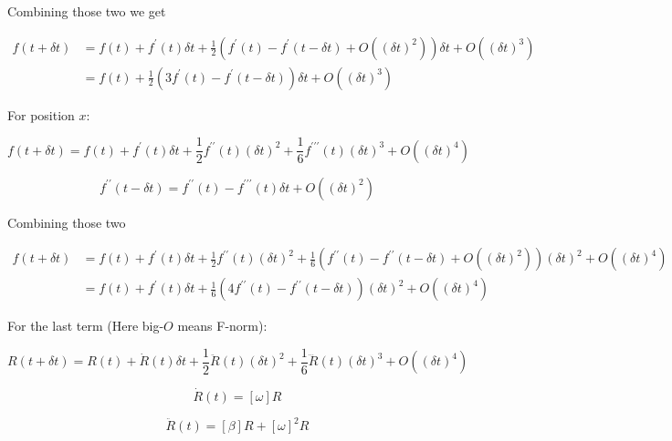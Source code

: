 \documentclass[utf8]{article}
\begin{document}
Combining those two we get

\begin{equation}\label{}
 \begin{aligned}
  f(t + \delta t) &= f(t) + f^\prime (t) \delta t + \frac{1}{2} (f^{\prime}(t) - f^\prime(t - \delta t) + O((\delta t)^2)) \delta t + O((\delta t)^3) \\
  &= f(t) + \frac{1}{2} (3f^{\prime}(t) - f^\prime(t - \delta t)) \delta t + O((\delta t)^3)
 \end{aligned}
\end{equation}

For position $x$:

\begin{equation}\label{}
  f(t + \delta t) = f(t) + f^\prime (t) \delta t + \frac{1}{2} f^{\prime\prime}(t) (\delta t)^2 + \frac{1}{6} f^{\prime\prime\prime}(t) (\delta t)^3 + O((\delta t)^4)
\end{equation}

\begin{equation}\label{}
  f^{\prime\prime}(t - \delta t) = f^{\prime\prime}(t) - f^{\prime\prime\prime}(t) \delta t + O((\delta t)^2)
\end{equation}

Combining those two

\begin{equation}\label{}
 \begin{aligned}
  f(t + \delta t) &= f(t) + f^\prime (t) \delta t + \frac{1}{2} f^{\prime\prime}(t) (\delta t)^2 + \frac{1}{6} (f^{\prime\prime}(t) - f^{\prime\prime}(t - \delta t) + O((\delta t)^2)) (\delta t)^2 + O((\delta t)^4) \\
  &= f(t) + f^\prime (t) \delta t + \frac{1}{6} (4f^{\prime\prime}(t) - f^{\prime\prime}(t - \delta t)) (\delta t)^2 + O((\delta t)^4)
 \end{aligned}
\end{equation}

For the last term (Here big-$O$ means F-norm):

\begin{equation}\label{}
  R(t+\delta t) = R(t) + \dot{R}(t) \delta t + \frac{1}{2} \ddot{R}(t) (\delta t)^2 + \frac{1}{6} \dddot{R}(t) (\delta t)^3 + O((\delta t)^4)
\end{equation}

\begin{equation}\label{}
  \dot{R}(t) = [\omega] R
\end{equation}

\begin{equation}\label{}
  \ddot{R}(t) = [\beta] R + [\omega]^2 R
\end{equation}
\end{document}
